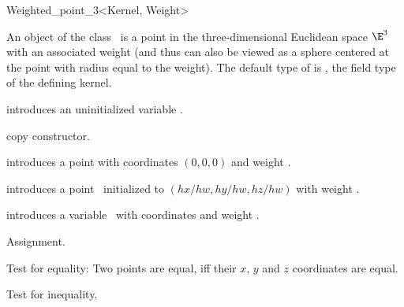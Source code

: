 \begin{ccRefClass} {Weighted_point_3<Kernel, Weight>}

\ccDefinition
An object of the class \ccRefName\ is a point in the three-dimensional
Euclidean space $\E^3$ with an associated weight (and thus can also be 
viewed as a sphere centered at the point with radius equal to the weight). 
The default type of  is , the
field type of the defining kernel.

\ccInheritsFrom
{}

\ccTypes


\ccCreation
{}


\ccHidden {}
             {introduces an uninitialized variable \ccVar.}

\ccHidden {}
            {copy constructor.}

            {introduces a point with  
             coordinates $(0,0,0)$ and weight .}

            {introduces a point \ccVar\ initialized to $(hx/hw,hy/hw, hz/hw)$
             with weight .
             }

            {introduces a variable \ccVar\ with 
             coordinates  and weight .}

\ccOperations

\ccHidden {}
        {Assignment.}

       {Test for equality: Two points are equal, iff their $x$, $y$ and $z$
        coordinates are equal.}

       {Test for inequality.}


\end{ccRefClass}
